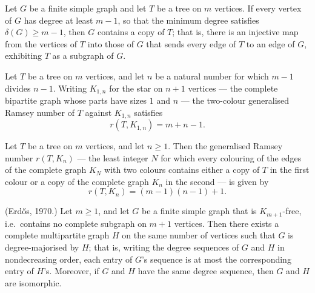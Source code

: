 \begin{theorem}
\label{SimpleGraph.tree_isContained_of_minDegree_le}
Let $G$ be a finite simple graph and let $T$ be a tree on $m$ vertices. If every vertex
of $G$ has degree at least $m-1$, so that the minimum degree satisfies $\delta(G) \ge
m-1$, then $G$ contains a copy of $T$; that is, there is an injective map from the
vertices of $T$ into those of $G$ that sends every edge of $T$ to an edge of $G$,
exhibiting $T$ as a subgraph of $G$.
\end{theorem}

\begin{theorem}
\label{SimpleGraph.generalisedRamsey_tree_star}
Let $T$ be a tree on $m$ vertices, and let $n$ be a natural number for which $m-1$
divides $n-1$. Writing $K_{1,n}$ for the star on $n+1$ vertices — the complete bipartite
graph whose parts have sizes $1$ and $n$ — the two-colour generalised Ramsey number of
$T$ against $K_{1,n}$ satisfies
\[
r(T, K_{1,n}) = m + n - 1.
\]
\end{theorem}

\begin{theorem}
\label{SimpleGraph.chvatal_tree_complete}
Let $T$ be a tree on $m$ vertices, and let $n \ge 1$. Then the generalised Ramsey number
$r(T, K_n)$ — the least integer $N$ for which every colouring of the edges of the
complete graph $K_N$ with two colours contains either a copy of $T$ in the first colour
or a copy of the complete graph $K_n$ in the second — is given by
\[
r(T, K_n) = (m - 1)(n - 1) + 1.
\]
\end{theorem}

\begin{theorem}
\label{SimpleGraph.degreeMajorised_of_cliqueFree}
(Erdős, 1970.) Let $m \ge 1$, and let $G$ be a finite simple graph that is
$K_{m+1}$-free, i.e.\ contains no complete subgraph on $m+1$ vertices. Then there exists
a complete multipartite graph $H$ on the same number of vertices such that $G$ is
degree-majorised by $H$; that is, writing the degree sequences of $G$ and $H$ in
nondecreasing order, each entry of $G$'s sequence is at most the corresponding entry of
$H$'s. Moreover, if $G$ and $H$ have the same degree sequence, then $G$ and $H$ are
isomorphic.
\end{theorem}

